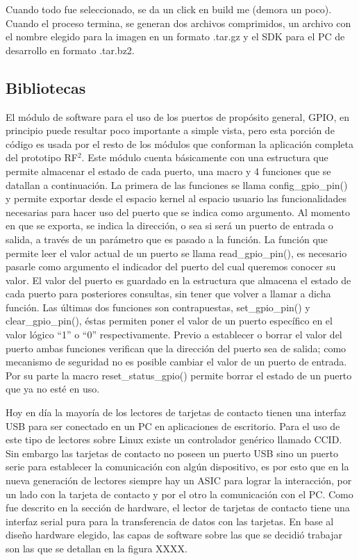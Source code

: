 \bigskip
Cuando todo fue seleccionado, se da un click en build me (demora un poco).
Cuando el proceso termina, se generan dos archivos comprimidos, un archivo con el nombre elegido para la imagen en un formato .tar.gz y el SDK para el PC de desarrollo en formato .tar.bz2. 

\subsection{Bibliotecas}


El módulo de software para el uso de los puertos de propósito general, GPIO, en principio puede resultar poco importante a simple vista, pero esta porción de código es usada por el resto de los módulos que conforman la aplicación completa del prototipo RF$^{2}$. 
Este módulo cuenta básicamente con una estructura que permite almacenar el estado de cada puerto, una macro y 4 funciones que se datallan a continuación.
La primera de las funciones se llama config\_gpio\_pin() y permite exportar desde el espacio kernel al espacio usuario las funcionalidades necesarias para hacer uso del puerto que se indica como argumento. Al momento en que se exporta, se indica la dirección, o sea si será un puerto de entrada o salida, a través de un parámetro que es pasado a la función.
La función que permite leer el valor actual de un puerto se llama read\_gpio\_pin(), es necesario pasarle como argumento el indicador del puerto del cual queremos conocer su valor. El valor del puerto es guardado en la estructura que almacena el estado de cada puerto para posteriores consultas, sin tener que volver a llamar a dicha función.
Las últimas dos funciones son contrapuestas, set\_gpio\_pin() y clear\_gpio\_pin(), éstas permiten poner el valor de un puerto específico en el valor lógico “1” o “0” respectivamente. Previo a establecer o borrar el valor del puerto ambas funciones verifican que la dirección del puerto sea de salida; como mecanismo de seguridad no es posible cambiar el valor de un puerto de entrada.
Por su parte la macro reset\_status\_gpio() permite borrar el estado de un puerto que ya no esté en uso.

\bigskip
{}

Hoy en día la mayoría de los lectores de tarjetas de contacto tienen una interfaz USB para ser conectado en un PC en aplicaciones de escritorio. Para el uso de este tipo de lectores sobre Linux existe un controlador genérico llamado CCID.
Sin embargo las tarjetas de contacto no poseen un puerto USB sino un puerto serie para establecer la comunicación con algún dispositivo, es por esto que en la nueva generación de lectores siempre hay un  ASIC para lograr la interacción, por un lado con la tarjeta de contacto y por el otro la comunicación con el PC.
Como fue descrito en la sección de hardware, el lector de tarjetas de contacto tiene una interfaz serial pura para la transferencia de datos con las tarjetas. En base al diseño hardware elegido, las capas de software sobre las que se decidió trabajar son las que se detallan en la figura XXXX. 

